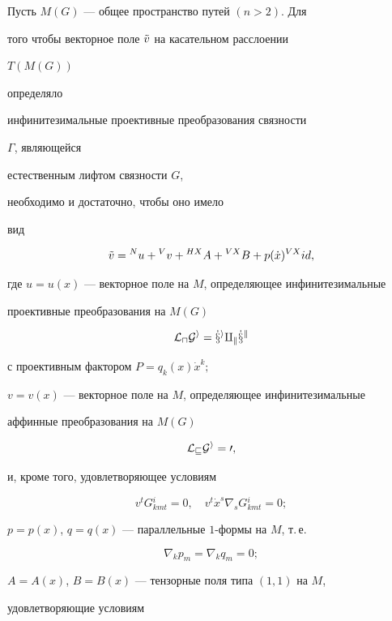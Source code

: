\begin{thmnonum} Пусть $M(G)$ --- общее пространство путей $(n>2)$. Для 


того чтобы векторное поле $\Tilde v$ на касательном расслоении 


$T(M(G))$ 


определяло 


инфинитезимальные проективные преобразования связности 


$\Gamma$, являющейся 


естественным лифтом связности $G$, 


необходимо и достаточно, чтобы оно имело 


вид 


$$ 


\Tilde v={}^Nu+{}^Vv+{}^{HX}A+{}^{VX}B+ 


p(\Dot x)^{VX}id, 


$$ 


где $u=u(x)$ --- векторное поле на $M$, определяющее инфинитезимальные 


проективные преобразования на $M(G)$ 


$$ 


\cal L_uG^i=\Dot x^i q_k\Dot x^k 


$$ 


с проективным фактором $P=q_k(x)\Dot x^k;$\newline 


$v=v(x)$ --- векторное поле на $M$, определяющее инфинитезимальные 


аффинные преобразования на $M(G)$ 


$$ 


\cal L_vG^i=0, 


$$ 


и, кроме того, удовлетворяющее условиям 


$$ 


v^tG{}^i_{kmt}=0,\quad 


v^t\Dot x ^s\nabla_s G{}^i_{kmt}=0; 


$$ 


$p=p(x)$, $q=q(x)$ --- параллельные $1$-формы на $M$, т.\,е. 


$$ 


\nabla_kp_m=\nabla_kq_m=0; 


$$ 


$A=A(x)$, $B=B(x)$ --- тензорные поля типа $(1,1)$ на $M$, 


удовлетворяющие условиям 


\begin{gather*} 



\end{gather*}
\end{thmnonum}

